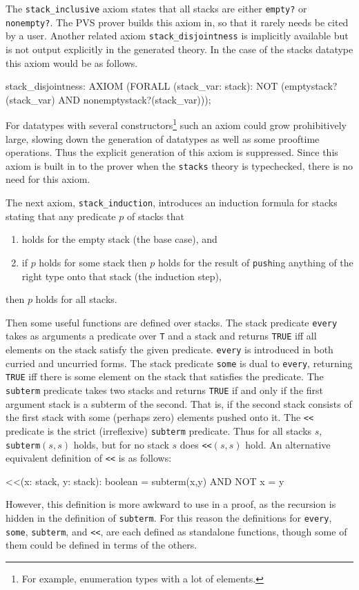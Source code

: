 The \texttt{stack\_inclusive} axiom states that all stacks are either
\texttt{empty?} or \texttt{nonempty?}.  The PVS prover builds this axiom
in, so that it rarely needs be cited by a user.  Another related axiom
\texttt{stack\_disjointness} is implicitly available but is not output
explicitly in the generated theory.  In the case of the stacks datatype
this axiom would be as follows.
\begin{pvsex}
  stack_disjointness: AXIOM
        (FORALL (stack_var: stack):
           NOT (emptystack?(stack_var) AND nonemptystack?(stack_var)));
\end{pvsex}
For datatypes with several constructors\footnote{For example, enumeration
types with a lot of elements.} such an axiom could grow prohibitively
large, slowing down the generation of datatypes as well as some prooftime
operations.  Thus the explicit generation of this axiom is suppressed.
Since this axiom is built in to the prover when the \texttt{stacks} theory
is typechecked, there is no need for this axiom.

\newpage
The next axiom, \texttt{stack\_induction}, introduces an induction formula
for stacks stating that any predicate $p$ of stacks that
\begin{enumerate}
\item holds for the empty stack (the base case), and
\item if $p$ holds for some stack then $p$ holds for the result of
\texttt{push}ing anything of the right type onto that stack (the induction
step),
\end{enumerate}
then $p$ holds for all stacks.

Then some useful functions are defined over stacks.  The stack predicate
\texttt{every} takes as arguments a predicate over \texttt{T} and a stack
and returns \texttt{TRUE} iff all elements on the stack satisfy the given
predicate.  \texttt{every} is introduced in both curried and uncurried
forms.  The stack predicate \texttt{some} is dual to \texttt{every},
returning \texttt{TRUE} iff there is some element on the stack that
satisfies the predicate.  The \texttt{subterm} predicate takes two stacks
and returns \texttt{TRUE} if and only if the first argument stack is a
subterm of the second.  That is, if the second stack consists of the first
stack with some (perhaps zero) elements pushed onto it.  The \texttt{<<}
predicate is the strict (irreflexive) \texttt{subterm} predicate.  Thus
for all stacks $s$, \texttt{subterm}$(s,s)$ holds, but for no stack $s$
does \texttt{<<}$(s,s)$ hold.  An alternative equivalent definition of
\texttt{<<} is as follows:
\begin{pvsex}
  <<(x: stack, y: stack): boolean = subterm(x,y) AND NOT x = y
\end{pvsex}
However, this definition is more awkward to use in a proof, as the
recursion is hidden in the definition of \texttt{subterm}.  For this
reason the definitions for \texttt{every}, \texttt{some},
\texttt{subterm}, and \texttt{<<}, are each defined as standalone
functions, though some of them could be defined in terms of the others.

